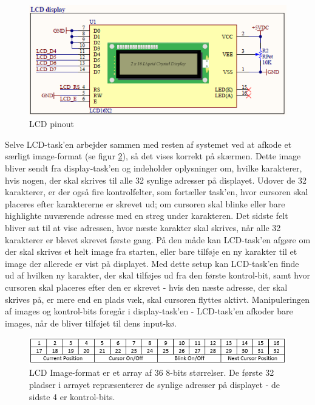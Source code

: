 \begin{figure}[ht]
			\begin{center}
			\includegraphics[scale=0.9]{Billeder/LCD.PNG}
			\end{center}
			\caption{LCD pinout}
			\label{fig:LCD}
\end{figure}

Selve LCD-task'en arbejder sammen med resten af systemet ved at afkode et særligt image-format (se figur \ref{fig:LCD_array}), så det vises korrekt på skærmen. Dette image bliver sendt fra display-task'en og indeholder oplysninger om, hvilke karakterer, hvis nogen, der skal skrives til alle 32 synlige adresser på displayet. Udover de 32 karakterer, er der også fire kontrolfelter, som fortæller task'en, hvor cursoren skal placeres efter karaktererne er skrevet ud; om cursoren skal blinke eller bare highlighte nuværende adresse med en streg under karakteren. Det sidste felt bliver sat til at vise adressen, hvor næste karakter skal skrives, når alle 32 karakterer er blevet skrevet første gang. På den måde kan LCD-task'en afgøre om der skal skrives et helt image fra starten, eller bare tilføje en ny karakter til et image der allerede er vist på displayet. Med dette setup kan LCD-task'en finde ud af hvilken ny karakter, der skal tilføjes ud fra den første kontrol-bit, samt hvor cursoren skal placeres efter den er skrevet - hvis den næste adresse, der skal skrives på, er mere end en plads væk, skal cursoren flyttes aktivt. Manipuleringen af images og kontrol-bits foregår i display-task'en - LCD-task'en afkoder bare images, når de bliver tilføjet til dens input-kø.


\begin{figure}[ht]
			\begin{center}
			\includegraphics[scale=0.9]{Billeder/LCD_Array.PNG}
			\end{center}
			\caption{LCD Image-format er et array af 36 8-bits størrelser. De første 32 pladser i arrayet repræsenterer de synlige adresser på displayet - de sidste 4 er kontrol-bits.}
			\label{fig:LCD_array}
\end{figure}

